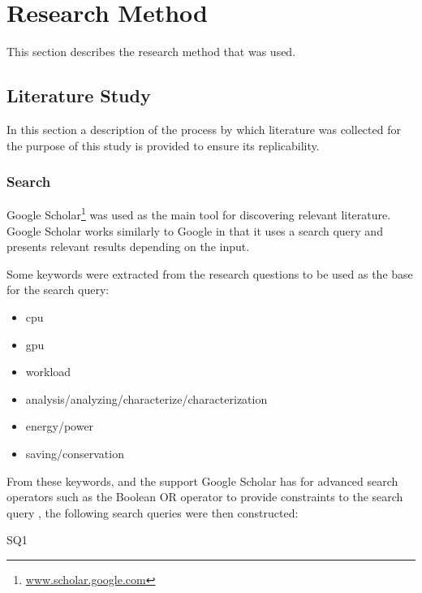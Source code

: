 \section{Research Method}
	This section describes the research method that was used.

	\subsection{Literature Study}
		In this section a description of the process by which literature was collected for the purpose of this study is provided to ensure its replicability.

		\subsubsection{Search}
			Google Scholar\footnote{\url{www.scholar.google.com}} was used as the main tool for discovering relevant literature.
			Google Scholar works similarly to Google in that it uses a search query and presents relevant results depending on the input.
		
			Some keywords were extracted from the research questions to be used as the base for the search query:
			\begin{itemize}
				\item \acrshort{cpu}
				\item \acrshort{gpu}
				\item workload
				\item analysis/analyzing/characterize/characterization
				\item energy/power
				\item saving/conservation
			\end{itemize}
		
			From these keywords, and the support Google Scholar has for advanced search operators such as the Boolean OR operator to provide constraints to the search query \parencite{Russel}, the following search queries were then constructed:
			\begin{aligneddescription}{SQ1}
				\item[SQ1] \sqOne
				\item[SQ2] \sqTwo
			\end{aligneddescription}
			
